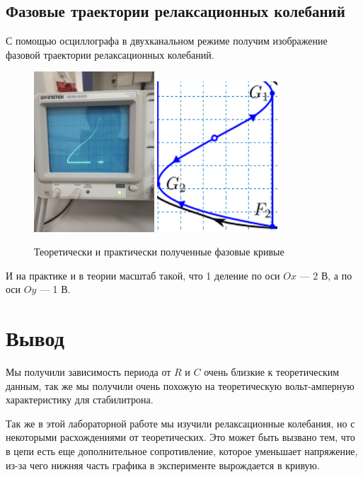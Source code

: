 \documentclass[a4paper, 12pt]{article}%
\begin{document}
\subsection*{Фазовые траектории релаксационных колебаний}
С помощью осциллографа в двухканальном режиме получим изображение фазовой траектории релаксационных колебаний.
\begin{figure}[h]
\begin{center}
\includegraphics[width = 0.4\textwidth]{6.jpg}
\includegraphics[width = 0.4\textwidth]{9.png}
\caption{Теоретически и практически полученные фазовые кривые}
\end{center}
\end{figure}
И на практике и в теории масштаб такой, что 1 деление по оси $Ox$  --- 2 В, а по оси $Oy$ --- 1 В.
\section*{Вывод}
Мы получили зависимость периода от $R$ и $C$ очень близкие к теоретическим данным, так же мы получили очень похожую на теоретическую вольт-амперную характеристику для стабилитрона. 

Так же в этой лабораторной работе мы изучили релаксационные колебания, но с некоторыми расхождениями от теоретических. Это может быть вызвано тем, что в цепи есть еще дополнительное сопротивление, которое уменьшает напряжение, из-за чего нижняя часть графика в эксперименте вырождается в кривую.
\end{document}
